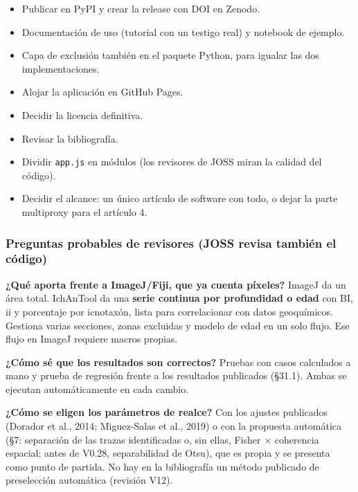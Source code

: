 \documentclass[
  10pt,
]{article}
\providecommand{\tightlist}{%
  \setlength{\itemsep}{0pt}\setlength{\parskip}{0pt}}
\begin{document}
\begin{itemize}
\tightlist
\item[$\square$]
  Publicar en PyPI y crear la release con DOI en Zenodo.
\item[$\square$]
  Documentación de uso (tutorial con un testigo real) y notebook de
  ejemplo.
\item[$\square$]
  Capa de exclusión también en el paquete Python, para igualar las dos
  implementaciones.
\item[$\square$]
  Alojar la aplicación en GitHub Pages.
\item[$\square$]
  Decidir la licencia definitiva.
\item[$\square$]
  Revisar la bibliografía.
\item[$\square$]
  Dividir \texttt{app.js} en módulos (los revisores de JOSS miran la
  calidad del código).
\item[$\square$]
  Decidir el alcance: un único artículo de software con todo, o dejar la
  parte multiproxy para el artículo 4.
\end{itemize}

\hypertarget{preguntas-probables-de-revisores-joss-revisa-tambiuxe9n-el-cuxf3digo}{%
\subsubsection{Preguntas probables de revisores (JOSS revisa también el
código)}\label{preguntas-probables-de-revisores-joss-revisa-tambiuxe9n-el-cuxf3digo}}

\textbf{¿Qué aporta frente a ImageJ/Fiji, que ya cuenta píxeles?} ImageJ
da un área total. IchAnTool da una \textbf{serie continua por
profundidad o edad} con BI, ii y porcentaje por icnotaxón, lista para
correlacionar con datos geoquímicos. Gestiona varias secciones, zonas
excluidas y modelo de edad en un solo flujo. Ese flujo en ImageJ
requiere macros propias.

\textbf{¿Cómo sé que los resultados son correctos?} Pruebas con casos
calculados a mano y prueba de regresión frente a los resultados
publicados (§31.1). Ambas se ejecutan automáticamente en cada cambio.

\textbf{¿Cómo se eligen los parámetros de realce?} Con los ajustes
publicados (Dorador et al., 2014; Miguez-Salas et al., 2019) o con la
propuesta automática (§7: separación de las trazas identificadas o, sin
ellas, Fisher × coherencia espacial; antes de V0.28, separabilidad de
Otsu), que es propia y se presenta como punto de partida. No hay en la
bibliografía un método publicado de preselección automática (revisión
V12).
\end{document}
